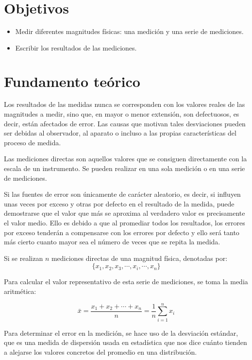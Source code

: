\documentclass[letter,twoside,11pt]{article}
\begin{document}
\section{Objetivos}
\begin{itemize}
\item Medir diferentes magnitudes físicas: una medición y una serie de
mediciones.
\item Escribir los resultados de las mediciones.
\end{itemize}

\section{Fundamento teórico}
Los resultados de las medidas nunca se corresponden con los valores reales de
las magnitudes a medir, sino que, en mayor o menor extensión, son defectuosos,
es decir, están afectados de error. Las causas que motivan tales desviaciones
pueden ser debidas al observador, al aparato o incluso a las propias
características del proceso de medida.

Las mediciones directas son aquellos valores que se consiguen directamente con
la escala de un instrumento. Se pueden realizar en una sola medición o en una
serie de mediciones.

Si las fuentes de error son únicamente de carácter aleatorio, es decir, si
influyen unas veces por exceso y otras por defecto en el resultado de la medida,
puede demostrarse que el valor que más se aproxima al verdadero valor es
precisamente el valor medio. Ello es debido a que al promediar todos los
resultados, los errores por exceso tenderán a compensarse con los errores por
defecto y ello será tanto más cierto cuanto mayor sea el número de veces que se
repita la medida.

Si se realizan $n$ mediciones directas de una magnitud física, denotadas
por:
\begin{equation}
    \{x_1,x_2,x_3,\cdots,x_i,\cdots,x_n\}
\end{equation}

Para calcular el valor representativo de esta serie de mediciones, se toma la
media aritmética:

\begin{equation}
    \bar{x} = \frac{x_1+x_2+\cdots+x_n}{n} = \frac{1}{n}\sum_{i=1}^{n} x_i
\end{equation}

Para determinar el error en la medición, se hace uso de la desviación estándar,
que es una medida de dispersión usada en estadística que nos dice cuánto tienden
a alejarse los valores concretos del promedio en una distribución.
\end{document}

